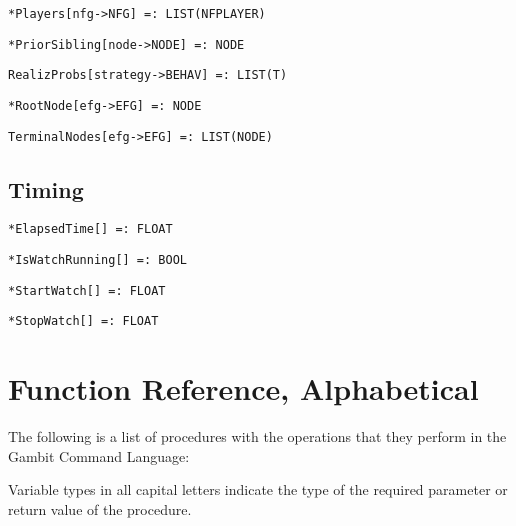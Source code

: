 \protect \large \begin{verbatim}
*Players[nfg->NFG] =: LIST(NFPLAYER)
\end{verbatim} \normalsize

\protect \large \begin{verbatim}
*PriorSibling[node->NODE] =: NODE
\end{verbatim}\normalsize

\protect \large \begin{verbatim}
RealizProbs[strategy->BEHAV] =: LIST(T)
\end{verbatim}\normalsize

\protect \large \begin{verbatim}
*RootNode[efg->EFG] =: NODE
\end{verbatim}\normalsize

\protect \large \begin{verbatim} 
TerminalNodes[efg->EFG] =: LIST(NODE)
\end{verbatim}\normalsize


\medskip
\subsection{Timing}


\protect \large \begin{verbatim}
*ElapsedTime[] =: FLOAT
\end{verbatim}\normalsize


\protect \large \begin{verbatim}
*IsWatchRunning[] =: BOOL
\end{verbatim}\normalsize


\protect \large \begin{verbatim}
*StartWatch[] =: FLOAT
\end{verbatim}\normalsize


\protect \large \begin{verbatim}
*StopWatch[] =: FLOAT
\end{verbatim}\normalsize


\section{Function Reference, Alphabetical}

The following is a list of procedures with the operations that they
perform in the Gambit Command Language:

Variable types in all capital letters indicate the type of the
required parameter or return value of the procedure.

